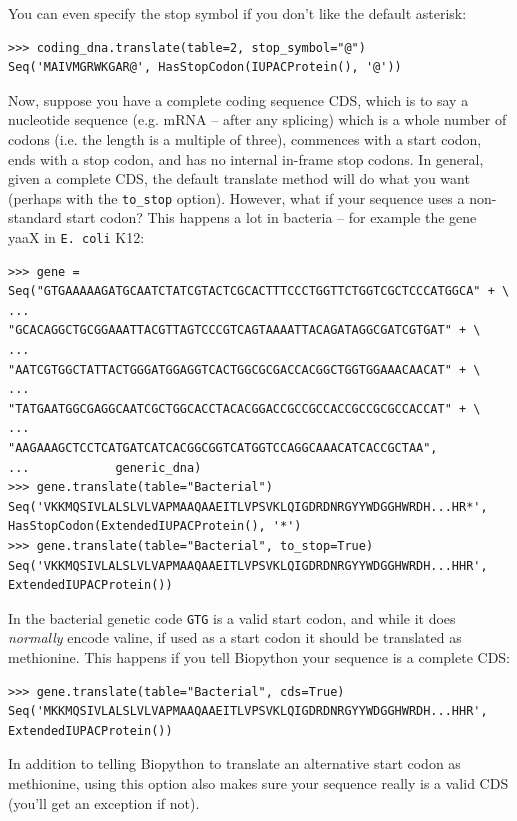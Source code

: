 \documentclass{report}
\begin{document}
You can even specify the stop symbol if you don't like the default asterisk:
\begin{verbatim}
>>> coding_dna.translate(table=2, stop_symbol="@")
Seq('MAIVMGRWKGAR@', HasStopCodon(IUPACProtein(), '@'))
\end{verbatim}

Now, suppose you have a complete coding sequence CDS, which is to say a
nucleotide sequence (e.g. mRNA -- after any splicing) which is a whole number
of codons (i.e. the length is a multiple of three), commences with a start
codon, ends with a stop codon, and has no internal in-frame stop codons.
In general, given a complete CDS, the default translate method will do what
you want (perhaps with the \verb|to_stop| option). However, what if your
sequence uses a non-standard start codon? This happens a lot in bacteria --
for example the gene yaaX in \texttt{E. coli} K12:

\begin{verbatim}
>>> gene = Seq("GTGAAAAAGATGCAATCTATCGTACTCGCACTTTCCCTGGTTCTGGTCGCTCCCATGGCA" + \
...            "GCACAGGCTGCGGAAATTACGTTAGTCCCGTCAGTAAAATTACAGATAGGCGATCGTGAT" + \
...            "AATCGTGGCTATTACTGGGATGGAGGTCACTGGCGCGACCACGGCTGGTGGAAACAACAT" + \
...            "TATGAATGGCGAGGCAATCGCTGGCACCTACACGGACCGCCGCCACCGCCGCGCCACCAT" + \
...            "AAGAAAGCTCCTCATGATCATCACGGCGGTCATGGTCCAGGCAAACATCACCGCTAA",
...            generic_dna)
>>> gene.translate(table="Bacterial")
Seq('VKKMQSIVLALSLVLVAPMAAQAAEITLVPSVKLQIGDRDNRGYYWDGGHWRDH...HR*',
HasStopCodon(ExtendedIUPACProtein(), '*')
>>> gene.translate(table="Bacterial", to_stop=True)
Seq('VKKMQSIVLALSLVLVAPMAAQAAEITLVPSVKLQIGDRDNRGYYWDGGHWRDH...HHR',
ExtendedIUPACProtein())
\end{verbatim}

\noindent In the bacterial genetic code \texttt{GTG} is a valid start codon,
and while it does \emph{normally} encode valine, if used as a start codon it
should be translated as methionine. This happens if you tell Biopython your
sequence is a complete CDS:

\begin{verbatim}
>>> gene.translate(table="Bacterial", cds=True)
Seq('MKKMQSIVLALSLVLVAPMAAQAAEITLVPSVKLQIGDRDNRGYYWDGGHWRDH...HHR',
ExtendedIUPACProtein())
\end{verbatim}

In addition to telling Biopython to translate an alternative start codon as
methionine, using this option also makes sure your sequence really is a valid
CDS (you'll get an exception if not).
\end{document}

